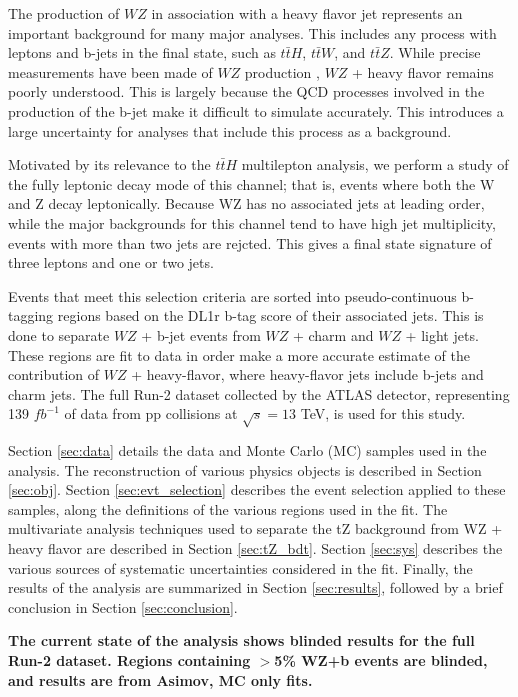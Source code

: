 
The production of $WZ$ in association with a heavy flavor jet represents an important background for many major analyses. This includes any process with leptons and b-jets in the final state, such as $t\bar{t}H$, $t\bar{t}W$, and $t\bar{t}Z$. While precise measurements have been made of $WZ$ production \cite{WZ_36}, $WZ$ + heavy flavor remains poorly understood. This is largely because the QCD processes involved in the production of the b-jet make it difficult to simulate accurately. This introduces a large uncertainty for analyses that include this process as a background.  

Motivated by its relevance to the $t\bar{t}H$ multilepton analysis, we perform a study of the fully leptonic decay mode of this channel; that is, events where both the W and Z decay leptonically. Because WZ has no associated jets at leading order, while the major backgrounds for this channel tend to have high jet multiplicity, events with more than two jets are rejcted. This gives a final state signature of three leptons and one or two jets.

Events that meet this selection criteria are sorted into pseudo-continuous b-tagging regions based on the DL1r b-tag score of their associated jets. This is done to separate $WZ$ + b-jet events from $WZ$ + charm and $WZ$ + light jets. These regions are fit to data in order make a more accurate estimate of the contribution of $WZ$ + heavy-flavor, where heavy-flavor jets include b-jets and charm jets. The full Run-2 dataset collected by the ATLAS detector, representing 139 $fb^{-1}$ of data from pp collisions at $\sqrt{s} = 13$ TeV, is used for this study.

Section \ref{sec:data} details the data and Monte Carlo (MC) samples used in the analysis. The reconstruction of various physics objects is described in Section \ref{sec:obj}. Section \ref{sec:evt_selection} describes the event selection applied to these samples, along the definitions of the various regions used in the fit. The multivariate analysis techniques used to separate the tZ background from WZ + heavy flavor are described in Section \ref{sec:tZ_bdt}. Section \ref{sec:sys} describes the various sources of systematic uncertainties considered in the fit. Finally, the results of the analysis are summarized in Section \ref{sec:results}, followed by a brief conclusion in Section \ref{sec:conclusion}.

\textbf{The current state of the analysis shows blinded results for the full Run-2 dataset. Regions containing $>$5\% WZ+b events are blinded, and results are from Asimov, MC only fits.}
